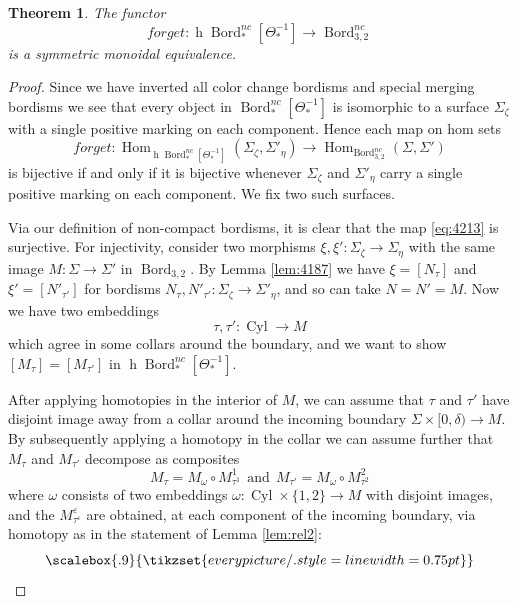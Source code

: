 \documentclass[reqno]{amsart}
\newtheorem{theorem}[lemma]{Theorem}
\theoremstyle{definition}
\newcommand{\opn}[1]{\operatorname{#1}}
\DeclareMathOperator{\Hom}{Hom}
\DeclareMathOperator{\Bord}{Bord}
\renewcommand{\1}{\mathbf{1}}
\begin{document}
\begin{theorem}\label{thm:unmarking}
The functor
\[
forget:\opn{h}\Bord_{\ast}^{nc}[\Theta^{-1}_{\ast}]\to \Bord_{3,2}^{nc}
\]
is a symmetric monoidal equivalence.
\end{theorem}

\begin{proof}
Since we have inverted all color change bordisms and special merging bordisms we see that every object in $\Bord_{\ast}^{nc}[\Theta^{-1}_{\ast}]$ is isomorphic to a surface $\Sigma_{\zeta}$ with a single positive marking on each component.  Hence each map on hom sets
\begin{equation}\label{eq:4213}
forget:\Hom_{\opn{h}\Bord_{\ast}^{nc}[\Theta^{-1}_{\ast}]}(\Sigma_{\zeta},\Sigma'_{\eta})\to \Hom_{\Bord^{nc}_{3,2}}(\Sigma,\Sigma')
\end{equation}
is bijective if and only if it is bijective whenever $\Sigma_{\zeta}$ and $\Sigma'_{\eta}$ carry a single positive marking on each component. We fix two such surfaces.
\par

Via our definition of non-compact bordisms, it is clear that the map \eqref{eq:4213} is surjective.  For injectivity, consider two morphisms $\xi,\xi':\Sigma_{\zeta}\to \Sigma_{\eta}$ with the same image $M:\Sigma\to \Sigma'$ in $\Bord_{3,2}$.  By Lemma \ref{lem:4187} we have $\xi=[N_{\tau}]$ and $\xi'=[N'_{\tau'}]$ for bordisms $N_{\tau},N'_{\tau'}:\Sigma_{\zeta}\to \Sigma'_{\eta}$, and so can take $N=N'=M$.  Now we have two embeddings
\[
\tau,\tau':\opn{Cyl}\to M
\]
which agree in some collars around the boundary, and we want to show $[M_{\tau}]=[M_{\tau'}]$ in $\opn{h}\Bord_{\ast}^{nc}[\Theta^{-1}_{\ast}]$.
\par

After applying homotopies in the interior of $M$, we can assume that $\tau$ and $\tau'$ have disjoint image away from a collar around the incoming boundary $\Sigma\times[0,\delta)\to M$.  By subsequently applying a homotopy in the collar we can assume further that $M_{\tau}$ and $M_{\tau'}$ decompose as composites
\[
M_{\tau}=M_{\omega}\circ M^1_{\tau^1}\ \ \text{and}\ \ M_{\tau'}=M_{\omega}\circ M^2_{\tau^2}
\]
where $\omega$ consists of two embeddings $\omega:\opn{Cyl}\times \{1,2\}\to M$ with disjoint images, and the $M^{\varepsilon}_{\tau^{\varepsilon}}$ are obtained, at each component of the incoming boundary, via homotopy as in the statement of Lemma \ref{lem:rel2}:
\[
\scalebox{.9}{
\tikzset{every picture/.style={line width=0.75pt}} %

}\]
\end{proof}
\end{document}
